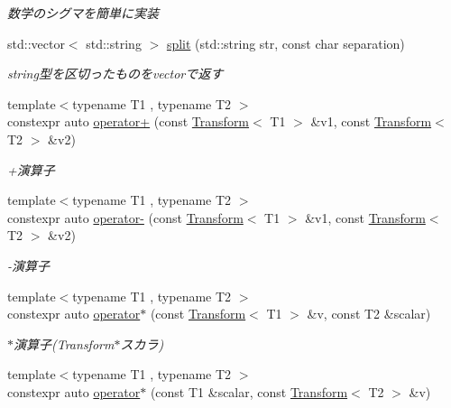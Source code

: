 \begin{DoxyCompactItemize}
\begin{DoxyCompactList}\small\item\em 数学のシグマを簡単に実装 \end{DoxyCompactList}\item 
std\+::vector$<$ std\+::string $>$ \mbox{\hyperlink{namespacesaki_ade59f0c4c6a95d2d9706cc99df0abad0}{split}} (std\+::string str, const char separation)
\begin{DoxyCompactList}\small\item\em string型を区切ったものをvectorで返す \end{DoxyCompactList}\item 
{\footnotesize template$<$typename T1 , typename T2 $>$ }\\constexpr auto \mbox{\hyperlink{namespacesaki_a5fad053b349698ccff4e555316544e68}{operator+}} (const \mbox{\hyperlink{classsaki_1_1_transform}{Transform}}$<$ T1 $>$ \&v1, const \mbox{\hyperlink{classsaki_1_1_transform}{Transform}}$<$ T2 $>$ \&v2)
\begin{DoxyCompactList}\small\item\em +演算子 \end{DoxyCompactList}\item 
{\footnotesize template$<$typename T1 , typename T2 $>$ }\\constexpr auto \mbox{\hyperlink{namespacesaki_a0efe115a634ca1910687617aa064f285}{operator-\/}} (const \mbox{\hyperlink{classsaki_1_1_transform}{Transform}}$<$ T1 $>$ \&v1, const \mbox{\hyperlink{classsaki_1_1_transform}{Transform}}$<$ T2 $>$ \&v2)
\begin{DoxyCompactList}\small\item\em -\/演算子 \end{DoxyCompactList}\item 
{\footnotesize template$<$typename T1 , typename T2 $>$ }\\constexpr auto \mbox{\hyperlink{namespacesaki_a34247f1a3390c2425f56909e10cc11f7}{operator$\ast$}} (const \mbox{\hyperlink{classsaki_1_1_transform}{Transform}}$<$ T1 $>$ \&v, const T2 \&scalar)
\begin{DoxyCompactList}\small\item\em $\ast$演算子(Transform$\ast$スカラ) \end{DoxyCompactList}\item 
{\footnotesize template$<$typename T1 , typename T2 $>$ }\\constexpr auto \mbox{\hyperlink{namespacesaki_a3d3864d0a671bd119a1d8202906d09d7}{operator$\ast$}} (const T1 \&scalar, const \mbox{\hyperlink{classsaki_1_1_transform}{Transform}}$<$ T2 $>$ \&v)

\end{DoxyCompactItemize}
